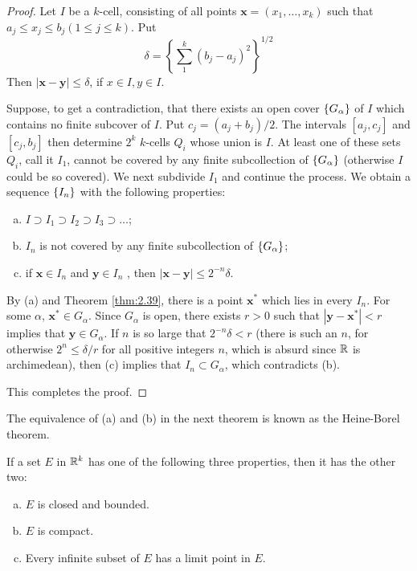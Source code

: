 \begin{proof}
    Let $I$ be a $k$-cell, 
    consisting of all points $\mathbf{x} = (x_1, \dots, x_k)$
    such that $a_j \leq x_j \leq  b_j (1 \leq j \leq k)$. 
    Put
    \begin{equation*}
        \delta = 
        \left\{ \sum_{1}^{k} (b_j - a_j)^2 \right\}^{1/2}
    \end{equation*} 
    Then $ \left| \mathbf{x-y} \right| \leq \delta$, if $x \in I, y \in I$.
    
    Suppose, to get a contradiction, 
    that there exists an open cover $\protect\{G_\alpha\}$ of $I$ 
    which contains no finite subcover of $I$. 
    Put $c_j = (a_j + b_j)/2$. 
    The intervals $[a_j , c_j]$ and $[c_j , b_j]$ 
    then determine $2^k$ $k$-cells $Q_i$ whose union is $I$.
    At least one of these sets $Q_i$, call it $I_1$, 
    cannot be covered by any finite subcollection of $\protect\{G_\alpha\}$ 
    (otherwise $I$ could be so covered). 
    We next subdivide $I_1$ and continue the process. 
    We obtain a sequence $\protect\{I_n\}$ with the following properties:
    \begin{enumerate}[(a)]
        \item $I \supset I_1 \supset I_2 \supset I_3 \supset \dots$;
        \item $I_n$ is not covered by any finite subcollection of $\protect\{G_\alpha\}$;
        \item if $\mathbf{x} \in I_n$ and $\mathbf{y} \in I_n$ , then $\left| \mathbf{x-y} \right| \leq 2^{-n}\delta$.
    \end{enumerate}
    
    By (a) and Theorem \ref{thm:2.39}, there is a point $\mathbf{x}^*$ which lies in every $I_n$. 
    For some $\alpha$, $\mathbf{x}^* \in G_\alpha$. 
    Since $G_\alpha$ is open, there exists $r > 0$ such that 
    $\left| \mathbf{y-x}^* \right| < r$ implies that $\mathbf{y} \in G_\alpha$. 
    If $n$ is so large that $2^{-n}\delta < r$ 
    (there is such an $n$, for otherwise $2^n \leq \delta/r$ for all positive integers $n$, which is absurd since ${\protect\mathbb R}$ is archimedean),
    then (c) implies that $I_n \subset G_\alpha$, which contradicts (b).
    
    This completes the proof.
\end{proof}

The equivalence of (a) and (b) in the next theorem is known as the Heine-Borel theorem.

\begin{thm}
    \label{thm:2.41}
    If a set $E$ in ${\protect\mathbb R}^k$ has one of the following three properties, then it has the other two:
    \begin{enumerate}[(a)]
        \item $E$ is closed and bounded.
        \item $E$ is compact.
        \item Every infinite subset of $E$ has a limit point in $E$.
    \end{enumerate}
\end{thm}

